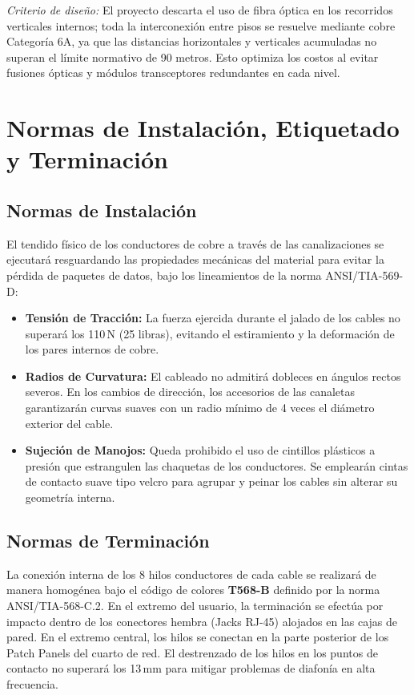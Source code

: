 \textit{Criterio de diseño:} El proyecto descarta el uso de fibra óptica en los recorridos verticales internos; toda la interconexión entre pisos se resuelve mediante cobre Categoría 6A, ya que las distancias horizontales y verticales acumuladas no superan el límite normativo de 90 metros. Esto optimiza los costos al evitar fusiones ópticas y módulos transceptores redundantes en cada nivel.

\section{Normas de Instalación, Etiquetado y Terminación}

\subsection{Normas de Instalación}
El tendido físico de los conductores de cobre a través de las canalizaciones se ejecutará resguardando las propiedades mecánicas del material para evitar la pérdida de paquetes de datos, bajo los lineamientos de la norma ANSI/TIA-569-D:
\begin{itemize}[label=$\bullet$,leftmargin=1.4em]
    \item \textbf{Tensión de Tracción:} La fuerza ejercida durante el jalado de los cables no superará los 110\,N (25 libras), evitando el estiramiento y la deformación de los pares internos de cobre.
    \item \textbf{Radios de Curvatura:} El cableado no admitirá dobleces en ángulos rectos severos. En los cambios de dirección, los accesorios de las canaletas garantizarán curvas suaves con un radio mínimo de 4 veces el diámetro exterior del cable.
    \item \textbf{Sujeción de Manojos:} Queda prohibido el uso de cintillos plásticos a presión que estrangulen las chaquetas de los conductores. Se emplearán cintas de contacto suave tipo velcro para agrupar y peinar los cables sin alterar su geometría interna.
\end{itemize}

\subsection{Normas de Terminación}
La conexión interna de los 8 hilos conductores de cada cable se realizará de manera homogénea bajo el código de colores \textbf{T568-B} definido por la norma ANSI/TIA-568-C.2.
En el extremo del usuario, la terminación se efectúa por impacto dentro de los conectores hembra (Jacks RJ-45) alojados en las cajas de pared.
En el extremo central, los hilos se conectan en la parte posterior de los Patch Panels del cuarto de red.
El destrenzado de los hilos en los puntos de contacto no superará los 13\,mm para mitigar problemas de diafonía en alta frecuencia.

